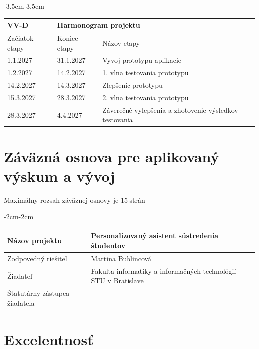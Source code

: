 \documentclass[10pt,slovak,a4paper]{article}
\begin{document}
\begin{table}[H]
\centering
\begin{adjustwidth}{-3.5cm}{-3.5cm}
\begin{tabularx}{\linewidth}{|l|l|X|}
\hline
\multicolumn{1}{|e|}{VV-D} & \multicolumn{2}{|f|}{Harmonogram projektu} \\ \hline
\multicolumn{1}{|e|}{Začiatok etapy} & \multicolumn{1}{|e|}{Koniec etapy} & \multicolumn{1}{|e|}{Názov etapy}\\ \hline
1.1.2027  & 31.1.2027 & Vyvoj prototypu aplikacie \\ \hline
1.2.2027 & 14.2.2027 & 1. vlna testovania prototypu \\ \hline
14.2.2027 & 14.3.2027 & Zlepšenie prototypu \\ \hline
15.3.2027 & 28.3.2027 & 2. vlna testovania prototypu \\ \hline
28.3.2027 & 4.4.2027 & Záverečné vylepšenia a zhotovenie výsledkov testovania \\ \hline

\end{tabularx}
\end{adjustwidth}
\end{table}


\clearpage

\section*{Záväzná osnova pre aplikovaný výskum a vývoj}
Maximálny rozsah záväznej osnovy je 15 strán

\begin{table}[H]
\centering
\begin{adjustwidth}{-2cm}{-2cm}
\begin{tabularx}{\linewidth}{|l|X|}
\hline
Názov projektu & Personalizovaný asistent sústredenia študentov \\ \hline
Zodpovedný riešiteľ & Martina Bublincová  \\ \hline
Žiadateľ & Fakulta informatiky a informačných technológií STU v Bratislave  \\ \hline
Štatutárny zástupca žiadateľa &   \\ \hline

\end{tabularx}
\end{adjustwidth}
\end{table}

\section{Excelentnosť}
\end{document}
